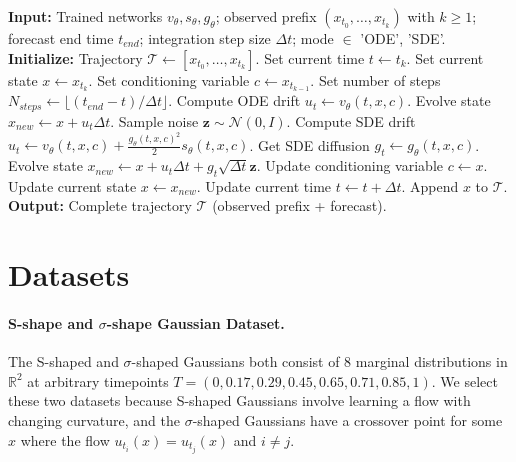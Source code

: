 \documentclass[twoside]{article}
\begin{document}
\begin{algorithm}[h!]
\caption{IMMFM Forecasting}
\label{alg:immfm_forecasting}
\begin{algorithmic}[1]
\State \textbf{Input:} Trained networks $v_{\theta}, s_{\theta}, g_{\theta}$; observed prefix $(x_{t_0}, \ldots, x_{t_k})$ with $k \ge 1$; forecast end time $t_{end}$; integration step size $\Delta t$; mode $\in$ {'ODE', 'SDE'}.
\State \textbf{Initialize:} Trajectory $\mathcal{T} \leftarrow [x_{t_0}, \ldots, x_{t_k}]$.
\State Set current time $t \leftarrow t_k$.
\State Set current state $x \leftarrow x_{t_k}$.
\State Set conditioning variable $c \leftarrow x_{t_{k-1}}$.
\State Set number of steps $N_{steps} \leftarrow \lfloor(t_{end} - t) / \Delta t\rfloor$.
    \State Compute ODE drift $u_t \leftarrow v_{\theta}(t,x,c)$.
    \State Evolve state $x_{new} \leftarrow x + u_t \Delta t$.
    \State Sample noise $\mathbf{z} \sim \mathcal{N}(0, I)$.
    \State Compute SDE drift $u_t \leftarrow v_{\theta}(t,x,c) + \frac{g_{\theta}(t,x,c)^2}{2} s_{\theta}(t,x,c)$.
    \State Get SDE diffusion $g_t \leftarrow g_{\theta}(t,x,c)$.
    \State Evolve state $x_{new} \leftarrow x + u_t \Delta t + g_t \sqrt{\Delta t}\mathbf{z}$.
\EndIf
\State Update conditioning variable $c \leftarrow x$.
\State Update current state $x \leftarrow x_{new}$.
\State Update current time $t \leftarrow t + \Delta t$.
\State Append $x$ to $\mathcal{T}$.
\EndFor
\State \textbf{Output:} Complete trajectory $\mathcal{T}$ (observed prefix + forecast).
\end{algorithmic}
\end{algorithm}

\newpage
\section{Datasets}
\label{app:datasets}



\paragraph{S-shape and $\sigma$-shape Gaussian Dataset.}

The S-shaped and $\sigma$-shaped Gaussians both consist of 8 marginal distributions in $\mathbb{R}^2$ at arbitrary timepoints $T = (0, 0.17, 0.29, 0.45, 0.65, 0.71,0.85, 1)$.
We select these two datasets because S-shaped Gaussians involve learning a flow with changing curvature, 
and the $\sigma$-shaped Gaussians have a crossover point for some $x$ where the flow $u_{t_i}(x) = u_{t_j}(x)$ 
and $i \neq j$. 
\end{document}
